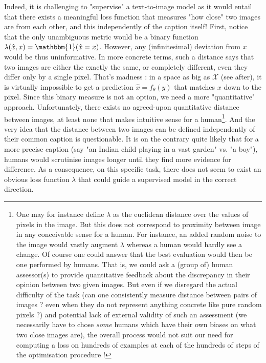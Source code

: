 \documentclass{article}
\begin{document}
\begin{appendix}
Indeed, it is challenging to "supervise" a text-to-image model as it would entail that there exists a meaningful loss function that measures "how close" two images are from each other, and this independently of the caption itself!
First, notice that the only unambiguous metric would be a binary function $\lambda(\hat x, x)=\mathbbm{1}(\hat x = x)$.
However, any (infinitesimal) deviation from $x$ would be thus uninformative.
In more concrete terms, such a distance says that two images are either the exactly the same, or completely different, even they differ only by a single pixel.
That's madness : in a space as big as $\mathcal{X}$ (see after), it is virtually impossible to get a prediction $\hat x=f_\theta(y)$ that matches $x$ down to the pixel.
Since this binary measure is not an option, we need a more "quantitative" approach.
Unfortunately, there exists no agreed-upon quantitative distance between images, at least none that makes intuitive sense for a human\footnote{One may for instance define $\lambda$ as the euclidean distance over the values of pixels in the image. But this does not correspond to proximity between image in any conceivable sense for a human. For instance, an added random noise to the image would vastly augment $\lambda$ whereas a human would hardly see a change. Of course one could answer that the best evaluation would then be one performed by humans.
That is, we could ask a (group of) human assessor(s) to provide quantitative feedback about the discrepancy in their opinion between two given images.
But even if we disregard the actual difficulty of the task (can one consistently measure distance between pairs of images ? even when they do not represent anything concrete like pure random pixels ?) and potential lack of external validity of such an assessment (we necessarily have to chose \textit{some} humans which have their own biases on what two close images are), the overall process would not suit our need for computing a loss on hundreds of examples at each of the hundreds of steps of the optimisation procedure !}.
And the very idea that the distance between two images can be defined independently of their common caption is questionable.
It is on the contrary quite likely that for a more precise caption (say "an Indian child playing in a vast garden" vs. "a boy"), humans would scrutinise images longer until they find more evidence for difference.
As a consequence, on this specific task, there does not seem to exist an obvious loss function $\lambda$ that could guide a supervised model in the correct direction.


\end{appendix}
\end{document}
